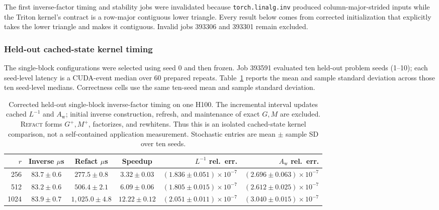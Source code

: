 \documentclass[11pt]{article}
\newcommand{\refact}{\textsc{Refact}}
\newcommand{\Aw}{A_{\mathrm w}}
\begin{document}
The first inverse-factor timing and stability jobs were invalidated because
\texttt{torch.linalg.inv} produced column-major-strided inputs while the
Triton kernel's contract is a row-major contiguous lower triangle.  Every
result below comes from corrected initialization that explicitly takes the
lower triangle and makes it contiguous.  Invalid jobs 393306 and 393301 remain
excluded.

\subsubsection{Held-out cached-state kernel timing}

The single-block configurations were selected using seed 0 and then frozen.
Job 393591 evaluated ten held-out problem seeds (1--10); each seed-level
latency is a CUDA-event median over 60 prepared repeats.
Table~\ref{tab:e5-inverse-heldout} reports the mean and sample standard
deviation across those ten seed-level medians.  Correctness cells use the
same ten-seed mean and sample standard deviation.

\begin{table}[ht]
\centering
\scriptsize
\caption{Corrected held-out single-block inverse-factor timing on one H100.
The incremental interval updates cached \(L^{-1}\) and \(\Aw\); initial inverse
construction, refresh, and maintenance of exact \(G,M\) are excluded.
\refact{} forms \(G^+,M^+\), factorizes, and rewhitens.  Thus this is an
isolated cached-state kernel comparison, not a self-contained application
measurement.  Stochastic entries are mean \(\pm\) sample SD over ten seeds.}
\label{tab:e5-inverse-heldout}
\begin{tabular}{@{}rcccrr@{}}
\toprule
\(r\) & Inverse \(\mu\)s & Refact \(\mu\)s & Speedup &
\(L^{-1}\) rel.\ err. & \(\Aw\) rel.\ err. \\
\midrule
256  & \(83.7\pm0.6\) & \(277.5\pm0.8\) &
  \(3.32\pm0.03\) & \((1.836\pm0.051)\times10^{-7}\) &
  \((2.696\pm0.063)\times10^{-7}\) \\
512  & \(83.2\pm0.6\) & \(506.4\pm2.1\) &
  \(6.09\pm0.06\) & \((1.805\pm0.015)\times10^{-7}\) &
  \((2.612\pm0.025)\times10^{-7}\) \\
1024 & \(83.9\pm0.7\) & \(1{,}025.0\pm4.8\) &
  \(12.22\pm0.12\) & \((2.051\pm0.011)\times10^{-7}\) &
  \((3.040\pm0.015)\times10^{-7}\) \\
\bottomrule
\end{tabular}
\end{table}
\end{document}
